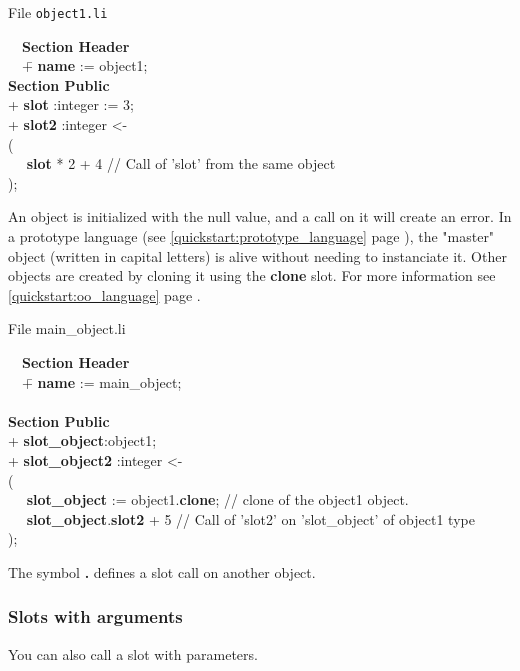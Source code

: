 \documentclass[11pt]{mybook}
\newcommand{\en}[1]
{
  \if \englishversion 1
  #1
  \fi
}
\begin{document}
\en{
File {\tt{}object1.li}
{\tt\begin{tabbing}
~~\= {\bf{}Section Header}\\
  \>~~\= + {\bf{}name} := {\sc{}object1};\\
  \> {\bf{}Section Public}\\
  \>  \> + {\bf{}slot} :{\sc{}integer}  := 3;\\
  \>  \> + {\bf{}slot2} :{\sc{}integer}  <-\\
  \>  \> (\\
  \>  \>~~ {\bf{}slot} * 2 + 4                    // Call of 'slot' from the same object\\
  \>  \> );\\
\end{tabbing}}

An object is initialized with the {\sc{}null} value, and a call on it will create an error.
In a prototype language (see \ref{quickstart:prototype_language} page \pageref{quickstart:prototype_language}), the "master" object (written in capital letters) is alive without needing to instanciate it.
Other objects are created by cloning it using the {\bf{}clone} slot. For more information see \ref{quickstart:oo_language} page \pageref{quickstart:oo_language}.

File main\_object.li

{\tt\begin{tabbing}
~~\= {\bf{}Section Header}\\
  \>~~\= + {\bf{}name} := {\sc{}main\_object};\\
\\
  \> {\bf{}Section Public}\\
  \> \> + {\bf{}slot\_object}:{\sc{}object1};\\
  \> \> + {\bf{}slot\_object2} :{\sc{}integer}  <-\\
  \> \> (\\
  \> \>~~ {\bf{}slot\_object} := {\sc{}object1}.{\bf{}clone};    // clone of the {\sc{}object1} object.\\
  \> \>~~ {\bf{}slot\_object}.{\bf{}slot2} + 5  // Call of 'slot2' on 'slot\_object' of {\sc{}object1} type\\
  \> \> );\\
\end{tabbing}}

The symbol {\bf{} .} defines a slot call on another object.\\}

\subsubsection{Slots with arguments}
\label{quickstart:slots:methods_functions:slot_arguments}
%
You can also call a slot with parameters.
\end{document}
